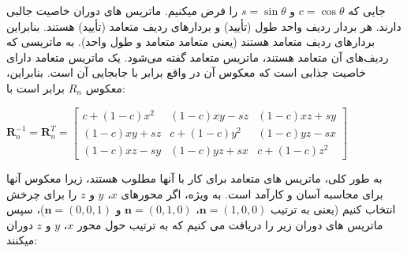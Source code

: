 {\begin{spacing}{1.5}
        جایی که $c=\cos\theta$ و $s=\sin\theta$ را فرض میکنیم.
        ماتریس های دوران خاصیت جالبی دارند. هر بردار ردیف واحد طول (تأیید) و بردارهای ردیف متعامد (تأیید) هستند.
        بنابراین بردارهای ردیف متعامد هستند (یعنی متعامد متعامد و طول واحد).
        به ماتریسی که ردیف‌های آن متعامد هستند، ماتریس متعامد گفته می‌شود.
        یک ماتریس متعامد دارای خاصیت جذابی است که معکوس آن در واقع برابر با جابجایی آن است. بنابراین، معکوس $R_{n}$ برابر است با:

        \begin{center}
            $\textbf{R}^{-1}_{n}=\textbf{R}^{T}_{n}=\begin{bmatrix}
                                                        c+(1-c)x^{2} & (1-c)xy-sz   & (1-c)xz+sy \\
                                                        (1-c)xy+sz   & c+(1-c)y^{2} & (1-c)yz-sx \\
                                                        (1-c)xz-sy   & (1-c)yz+sx   & c+(1-c)z^{2}
            \end{bmatrix}$
        \end{center}

        به طور کلی، ماتریس های متعامد برای کار با آنها مطلوب هستند، زیرا معکوس آنها برای محاسبه آسان و کارآمد است.
        به ویژه، اگر محورهای $x$، $y$ و $z$ را برای چرخش انتخاب کنیم (یعنی به ترتیب $\textbf{n}=(1,0,0)$، $\textbf{n}=(0,1,0)$ و $\textbf{n}=(0,0,1)$)،
        سپس ماتریس های دوران زیر را دریافت می کنیم که به ترتیب حول محور $x$، $y$ و $z$ دوران میکنند:


\end{spacing}}
